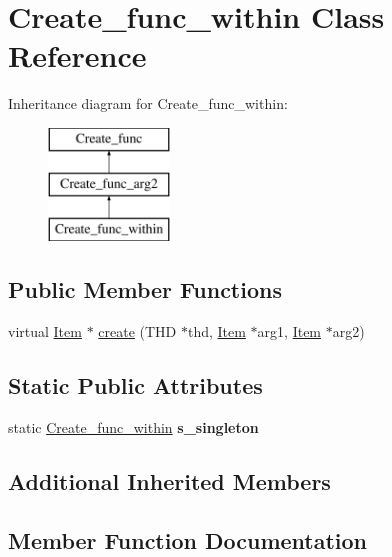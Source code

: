 \hypertarget{classCreate__func__within}{}\section{Create\+\_\+func\+\_\+within Class Reference}
\label{classCreate__func__within}
Inheritance diagram for Create\+\_\+func\+\_\+within\+:\begin{figure}[H]
\begin{center}
\leavevmode
\includegraphics[height=3.000000cm]{classCreate__func__within}
\end{center}
\end{figure}
\subsection*{Public Member Functions}
\begin{DoxyCompactItemize}
\item 
virtual \mbox{\hyperlink{classItem}{Item}} $\ast$ \mbox{\hyperlink{classCreate__func__within_a927c6bf969e231e58b5ab2a08858ba1d}{create}} (T\+HD $\ast$thd, \mbox{\hyperlink{classItem}{Item}} $\ast$arg1, \mbox{\hyperlink{classItem}{Item}} $\ast$arg2)
\end{DoxyCompactItemize}
\subsection*{Static Public Attributes}
\begin{DoxyCompactItemize}
\item 
\mbox{\label{classCreate__func__within_a6a5f042db0c8567401d00169c66432f7}} 
static \mbox{\hyperlink{classCreate__func__within}{Create\+\_\+func\+\_\+within}} {\bfseries s\+\_\+singleton}
\end{DoxyCompactItemize}
\subsection*{Additional Inherited Members}


\subsection{Member Function Documentation}
\mbox{\label{classCreate__func__within_a927c6bf969e231e58b5ab2a08858ba1d}} 

